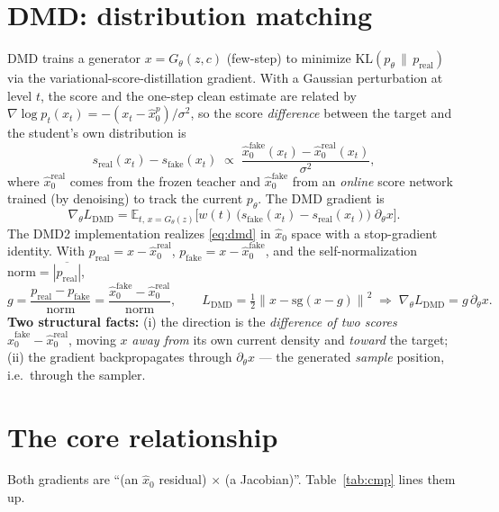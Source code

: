 \documentclass[11pt,a4paper]{article}
\newcommand{\E}{\mathbb{E}}
\newcommand{\norm}[1]{\left\lVert #1 \right\rVert}
\newcommand{\KL}{\mathrm{KL}}
\newcommand{\sg}{\mathrm{sg}}
\newcommand{\xh}{\hat{x}_0}
\newcommand{\real}{\mathrm{real}}
\newcommand{\fake}{\mathrm{fake}}
\begin{document}
\section{DMD: distribution matching}
DMD trains a generator $x=G_\theta(z,c)$ (few-step) to minimize $\KL(p_\theta\,\|\,p_{\real})$ via
the variational-score-distillation gradient. With a Gaussian perturbation at level $t$, the score
and the one-step clean estimate are related by
$\nabla\log p_t(x_t)=-(x_t-\xh^{p})/\sigma^2$, so the score \emph{difference} between the target and
the student's own distribution is
\begin{equation}
s_{\real}(x_t)-s_{\fake}(x_t)\;\propto\;\frac{\xh^{\fake}(x_t)-\xh^{\real}(x_t)}{\sigma^2},
\end{equation}
where $\xh^{\real}$ comes from the frozen teacher and $\xh^{\fake}$ from an \emph{online} score
network trained (by denoising) to track the current $p_\theta$. The DMD gradient is
\begin{equation}\label{eq:dmd}
\nabla_\theta L_{\mathrm{DMD}}
=\E_{t,\,x=G_\theta(z)}\!\Big[w(t)\,\big(s_{\fake}(x_t)-s_{\real}(x_t)\big)\;\partial_\theta x\Big].
\end{equation}
The DMD2 implementation realizes \eqref{eq:dmd} in $\xh$ space with a stop-gradient identity. With
$p_{\real}=x-\xh^{\real}$, $p_{\fake}=x-\xh^{\fake}$, and the self-normalization
$\mathrm{norm}=\overline{|p_{\real}|}$,
\begin{equation}\label{eq:dmd2}
g=\frac{p_{\real}-p_{\fake}}{\mathrm{norm}}=\frac{\xh^{\fake}-\xh^{\real}}{\mathrm{norm}},
\qquad
L_{\mathrm{DMD}}=\tfrac12\norm{x-\sg(x-g)}^2
\;\Rightarrow\;
\nabla_\theta L_{\mathrm{DMD}}=g\,\partial_\theta x .
\end{equation}
\textbf{Two structural facts:} (i) the direction is the \emph{difference of two scores}
$\xh^{\fake}-\xh^{\real}$, moving $x$ \emph{away from} its own current density and \emph{toward} the
target; (ii) the gradient backpropagates through $\partial_\theta x$ --- the generated \emph{sample}
position, i.e.\ through the sampler.

\section{The core relationship}
Both gradients are ``(an $\xh$ residual) $\times$ (a Jacobian)''. Table~\ref{tab:cmp} lines them up.
\end{document}
